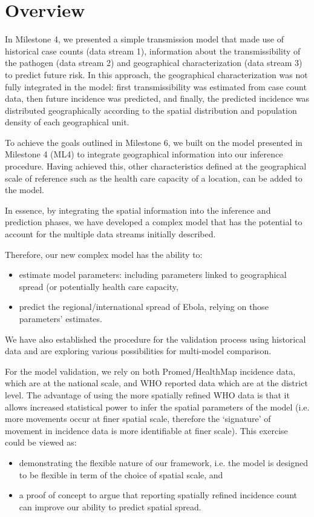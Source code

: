 \documentclass[11pt,]{article}
\begin{document}
\section{Overview}

In Milestone 4, we presented a simple transmission model that made use of
historical case counts (data stream 1), information about the
transmissibility of the pathogen (data stream 2) and geographical
characterization (data stream 3) to predict future risk. 
In this approach, the geographical characterization was not fully integrated in the model:
first transmissibility was estimated from case count data, then future incidence was predicted, and 
finally, the predicted incidence was distributed geographically according to the spatial distribution 
and population density of each geographical unit.

To achieve the goals outlined in Milestone 6, we built on the model presented in Milestone 4 
(ML4) to integrate geographical information into our inference procedure.
Having achieved this, other characteristics defined at the geographical
scale of reference such as the health care capacity of a location, can be 
added to the model.

In essence, by integrating the spatial information into the inference
and prediction phases, we have developed a complex model that has the potential to
account for the multiple data streams initially described.

Therefore, our new complex model has the ability to:
\begin{itemize}
\item estimate model parameters: including parameters linked to geographical spread (or
potentially health care capacity,
\item predict the regional/international spread of Ebola, relying on those parameters' estimates. 
\end{itemize}

We have also established the procedure for the validation process
using historical data and are exploring various possibilities for multi-model comparison. 

For the model validation, we rely on both Promed/HealthMap incidence data, which are 
at the national scale, and WHO reported data which are at the district level. The advantage 
of using the more spatially refined WHO data is that it allows increased statistical power to 
infer the spatial parameters of the model (i.e. more movements occur at finer spatial scale, 
therefore the `signature' of movement in incidence data is more identifiable at finer scale).
This exercise could be viewed as:
\begin{itemize}
\item demonstrating the flexible nature of our framework, i.e. 
the model is designed to be flexible in term of the choice of spatial scale, and
\item a proof of concept to argue that reporting spatially refined incidence count can improve our ability to
predict spatial spread.
\end{itemize}
\end{document}
